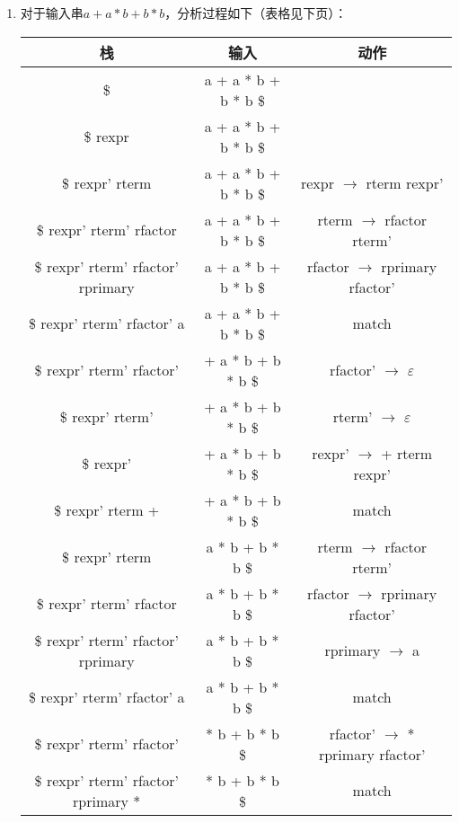 \documentclass[UTF8]{report}
\begin{document}
\begin{enumerate}[label=(\arabic*)]
    \item 对于输入串$a + a * b + b * b$，分析过程如下（表格见下页）：
    
    \begin{table}[H]
        \centering
        \begin{tabular}{|c|c|c|}
            \hline
            栈 & 输入 & 动作 \\
            \hline
            \$ & a + a * b + b * b \$ &  \\
            \hline
            \$ rexpr & a + a * b + b * b \$ &  \\
            \hline
            \$ rexpr' rterm & a + a * b + b * b \$ & rexpr $\to$ rterm rexpr' \\
            \hline
            \$ rexpr' rterm' rfactor & a + a * b + b * b \$ & rterm $\to$ rfactor rterm' \\
            \hline
            \$ rexpr' rterm' rfactor' rprimary & a + a * b + b * b \$ & rfactor $\to$ rprimary rfactor' \\
            \hline
            \$ rexpr' rterm' rfactor' a & a + a * b + b * b \$ & match \\
            \hline
            \$ rexpr' rterm' rfactor' & + a * b + b * b \$ & rfactor' $\to$ $\varepsilon$ \\
            \hline
            \$ rexpr' rterm' & + a * b + b * b \$ & rterm' $\to$ $\varepsilon$ \\
            \hline
            \$ rexpr' & + a * b + b * b \$ & rexpr' $\to$ + rterm rexpr' \\
            \hline
            \$ rexpr' rterm + & + a * b + b * b \$ & match \\
            \hline
            \$ rexpr' rterm & a * b + b * b \$ & rterm $\to$ rfactor rterm' \\
            \hline
            \$ rexpr' rterm' rfactor & a * b + b * b \$ & rfactor $\to$ rprimary rfactor' \\
            \hline
            \$ rexpr' rterm' rfactor' rprimary & a * b + b * b \$ & rprimary $\to$ a \\
            \hline
            \$ rexpr' rterm' rfactor' a & a * b + b * b \$ & match \\
            \hline
            \$ rexpr' rterm' rfactor' & * b + b * b \$ & rfactor' $\to$ * rprimary rfactor' \\
            \hline
            \$ rexpr' rterm' rfactor' rprimary * & * b + b * b \$ & match \\

\end{tabular}
\end{table}
\end{enumerate}
\end{document}
